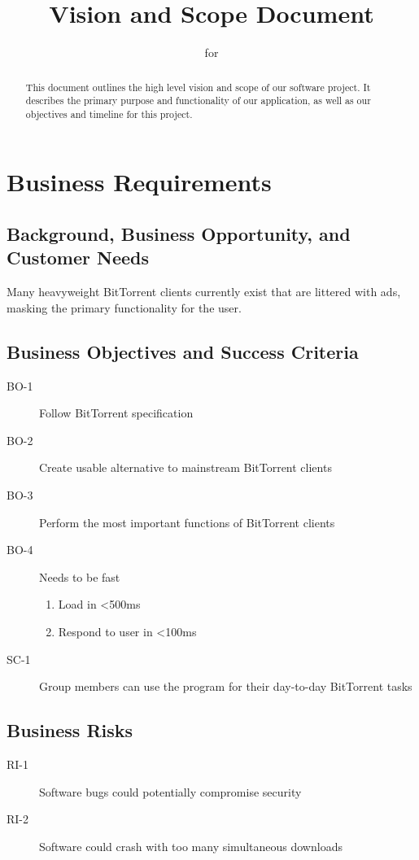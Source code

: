 \documentclass[letter]{scrartcl}
\newcommand{\app}{\sc{393torrent}}
\begin{document}
\title{Vision and Scope Document}
\subtitle{for \app}
\date{} %

\maketitle

\begin{abstract}
This document outlines the high level vision and scope of our software project.  It describes the primary purpose and functionality of our application, as well as our objectives and timeline for this project. 
\end{abstract}

\tableofcontents
\pagebreak

\section{Business Requirements}
\subsection{Background, Business Opportunity, and Customer Needs}
Many heavyweight BitTorrent clients currently exist that are littered with ads, masking the primary functionality for the user.

\subsection{Business Objectives and Success Criteria}
\begin{description}
\item[BO-1] Follow BitTorrent specification
\item[BO-2] Create usable alternative to mainstream BitTorrent clients
\item[BO-3] Perform the most important functions of BitTorrent clients
\item[BO-4] Needs to be fast 
\begin{enumerate}
  \item Load in \textless500ms
  \item Respond to user in \textless100ms
\end{enumerate}
\item[SC-1] Group members can use the program for their day-to-day BitTorrent tasks
\end{description}

\subsection{Business Risks}
\begin{description}
\item[RI-1] Software bugs could potentially compromise security
\item[RI-2] Software could crash with too many simultaneous downloads
\end{description}
\end{document}
